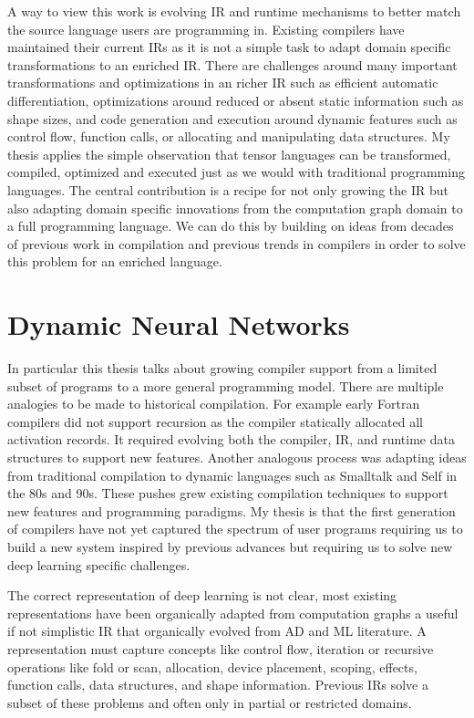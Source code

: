 A way to view this work is evolving IR and runtime mechanisms to better
  match the source language users are programming in.
Existing compilers have maintained their current IRs as it is not a simple
  task to adapt domain specific transformations to an enriched IR.
There are challenges around many important transformations and optimizations
  in an richer IR such as efficient automatic differentiation, optimizations around
  reduced or absent static information such as shape sizes, and code generation
  and execution around dynamic features such as control flow, function calls,
  or allocating and manipulating data structures.
My thesis applies the simple observation that tensor languages can be transformed, compiled,
  optimized and executed just as we would with traditional programming languages.
The central contribution is a recipe for not only growing the IR but also
  adapting domain specific innovations from the computation graph domain to
  a full programming language.
We can do this by building on ideas from decades of previous work in compilation and previous
    trends in compilers in order to solve this problem for an enriched language.

\section{Dynamic Neural Networks}

In particular this thesis talks about growing compiler support from
  a limited subset of programs to a more general programming model.
There are multiple analogies to be made to historical compilation.
For example early Fortran compilers did not support recursion
  as the compiler statically allocated all activation records.
It required evolving both the compiler, IR, and runtime data structures
  to support new features.
Another analogous process was adapting ideas from traditional compilation
  to dynamic languages such as Smalltalk and Self in the 80s and 90s.
These pushes grew existing compilation techniques to support new features
  and programming paradigms.
My thesis is that the first generation of compilers have not yet
  captured the spectrum of user programs requiring us to build
  a new system inspired by previous advances but requiring
  us to solve new deep learning specific challenges.

The correct representation of deep learning is not clear, most
  existing representations have been organically adapted from
  computation graphs a useful if not simplistic IR that organically
  evolved from AD and ML literature.
A representation must capture concepts like control flow, iteration
  or recursive operations like fold or scan, allocation,
  device placement, scoping, effects, function calls, data structures,
  and shape information.
Previous IRs solve a subset of these problems and often only in partial
  or restricted domains.

